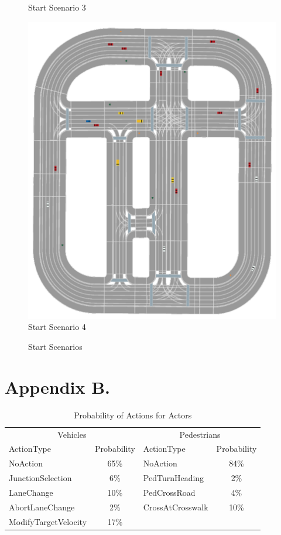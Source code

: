\begin{figure}[ht]
\begin{minipage}[b]{0.43\linewidth}
		Start Scenario 3
	\end{minipage}%
	\begin{minipage}[b]{0.43\linewidth}
		\centering
		\includegraphics[width=1\linewidth]{figures/start_scenarios/scenario_4} 
		Start Scenario 4
	\end{minipage} 
	\caption{Start Scenarios}
	\label{fig:appendix:start_scenarios} 
\end{figure}


\chapter{Appendix B.}
\label{chap:appendix_b}
\begin{table}[ht]
	\centering
	\begin{tabular}{lc|lc}
		\hline
		\multicolumn{2}{c|}{Vehicles} & \multicolumn{2}{c}{Pedestrians} \\
		ActionType & Probability & ActionType & Probability \\
		\hline
		NoAction & 65\% & NoAction & 84\% \\
		JunctionSelection & 6\% & PedTurnHeading & 2\% \\
		LaneChange & 10\% & PedCrossRoad & 4\% \\
		AbortLaneChange & 2\% & CrossAtCrosswalk & 10\% \\
		ModifyTargetVelocity & 17\% & & \\
		\hline
	\end{tabular}
	\caption{Probability of Actions for Actors}
	\label{tab:appendix:action_probabilities}
\end{table}


